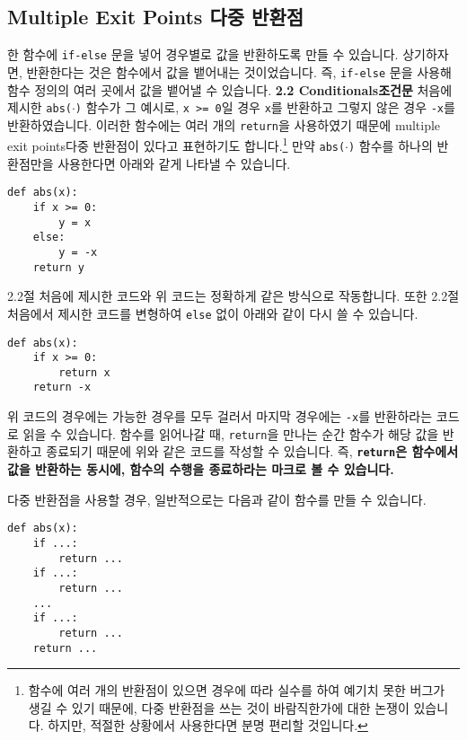 \documentclass[../main.tex]{subfiles}
\begin{document}
\subsection{Multiple Exit Points 다중 반환점}
한 함수에 \texttt{if-else} 문을 넣어 경우별로 값을 반환하도록 만들 수 있습니다.
상기하자면, 반환한다는 것은 함수에서 값을 뱉어내는 것이었습니다.
즉, \verb|if-else| 문을 사용해 함수 정의의 여러 곳에서 값을 뱉어낼 수 있습니다.
\textbf{2.2 Conditionals조건문} 처음에 제시한 \texttt{abs($\cdot$)} 함수가 그
예시로, \texttt{x >= 0}일 경우 \texttt{x}를 반환하고 그렇지 않은 경우
\texttt{-x}를 반환하였습니다.  이러한 함수에는 여러 개의 \texttt{return}을
사용하였기 때문에 multiple exit points다중 반환점이 있다고 표현하기도
합니다.\footnote{함수에 여러 개의 반환점이 있으면 경우에 따라 실수를 하여 예기치
 못한 버그가 생길 수 있기 때문에, 다중 반환점을 쓰는 것이 바람직한가에 대한 논쟁이
있습니다. 하지만, 적절한 상황에서 사용한다면 분명 편리할 것입니다.} 만약
\texttt{abs($\cdot$)} 함수를 하나의 반환점만을 사용한다면 아래와 같게 나타낼 수
있습니다.
\begin{verbatim}
def abs(x):
    if x >= 0:
        y = x
    else:
        y = -x
    return y
\end{verbatim}
2.2절 처음에 제시한 코드와 위 코드는 정확하게 같은 방식으로 작동합니다.
또한 2.2절 처음에서 제시한 코드를 변형하여 \texttt{else} 없이
아래와 같이 다시 쓸 수 있습니다.
\begin{verbatim}
def abs(x):
    if x >= 0:
        return x
    return -x
\end{verbatim}
위 코드의 경우에는 가능한 경우를 모두 걸러서 마지막 경우에는 \texttt{-x}를
반환하라는 코드로 읽을 수 있습니다.
함수를 읽어나갈 때, \verb|return|을 만나는 순간 함수가 해당 값을 반환하고
종료되기 때문에 위와 같은 코드를 작성할 수 있습니다.
즉, \textbf{\texttt{return}은 함수에서 값을 반환하는 동시에, 함수의 수행을
종료하라는 마크로 볼 수 있습니다.}

다중 반환점을 사용할 경우, 일반적으로는 다음과 같이
함수를 만들 수 있습니다.
\begin{verbatim}
def abs(x):
    if ...:
        return ...
    if ...:
        return ...
    ...
    if ...:
        return ...
    return ...
\end{verbatim}
\end{document}
